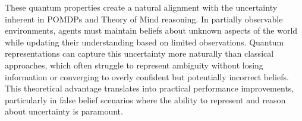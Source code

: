 \documentclass[11pt]{article}
\begin{document}
These quantum properties create a natural alignment with the uncertainty inherent in POMDPs and Theory of Mind reasoning. In partially observable environments, agents must maintain beliefs about unknown aspects of the world while updating their understanding based on limited observations. Quantum representations can capture this uncertainty more naturally than classical approaches, which often struggle to represent ambiguity without losing information or converging to overly confident but potentially incorrect beliefs. This theoretical advantage translates into practical performance improvements, particularly in false belief scenarios where the ability to represent and reason about uncertainty is paramount.
\end{document}
